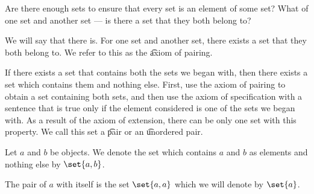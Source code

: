 

Are there enough sets to ensure that every set is an element of some set?
What of one set and another set --- is there a set that they both belong to?


We will say that there is.
For one set and another set, there exists a set that they both belong to.
We refer to this as the \t{axiom of pairing}.

If there exists a set that contains both the sets we began with, then there exists a set which contains them and nothing else.
First, use the axiom of pairing to obtain a set containing both sets, and then use the axiom of specification with a sentence that is true only if the element considered is one of the sets we began with.
As a result of the axiom of extension, there can be only one set with this property.
We call this set a \t{pair} or an \t{unordered pair}.


Let $a$ and $b$ be objects.
We denote the set which contains $a$ and $b$ as elements and nothing else by $\set{a, b}$.

The pair of $a$ with itself is the set $\set{a, a}$ which we will denote by $\set{a}$.
